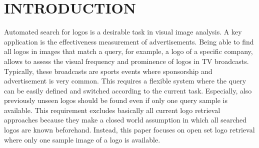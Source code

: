 \documentclass[a4paper,twoside]{article}
\begin{document}
\onecolumn \maketitle \normalsize \vfill

\section{\uppercase{Introduction}}
\label{sec:introduction}
%
%
%
\noindent Automated search for logos is a desirable task in visual image analysis.
A key application is the effectiveness measurement of advertisements. Being able to find all logos in images that match a query, for example, a logo of a specific company, allows to assess the visual frequency and prominence of logos in TV broadcasts. Typically, these broadcasts are sports events where sponsorship and advertisement is very common. 
This requires a flexible system where the query can be easily defined and switched according to the current task. Especially, also previously unseen logos should be found even if only one query sample is available.
This requirement excludes basically all current logo retrieval approaches because they make a closed world assumption in which all searched logos are known beforehand. Instead, this paper focuses on open set logo retrieval where only one sample image of a logo is available. 
\end{document}
